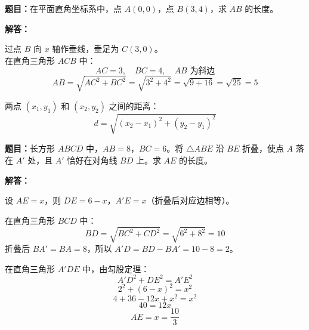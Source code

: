 \documentclass[12pt, a4paper]{ctexart}
\begin{document}
\begin{examplebox}[【例题3】勾股定理与坐标系结合]
\textbf{题目：}在平面直角坐标系中，点 $A(0,0)$，点 $B(3,4)$，求 $AB$ 的长度。

\vspace{6pt}
\textbf{解答：}

过点 $B$ 向 $x$ 轴作垂线，垂足为 $C(3,0)$。\\
在直角三角形 $ACB$ 中：
\[
AC = 3,\quad BC = 4,\quad AB \text{ 为斜边}
\]
\[
AB = \sqrt{AC^2 + BC^2} = \sqrt{3^2 + 4^2} = \sqrt{9+16} = \sqrt{25} = \boxed{5}
\]
\end{examplebox}

\begin{tipbox}
两点 $(x_1,y_1)$ 和 $(x_2,y_2)$ 之间的距离：
\[
d = \sqrt{(x_2 - x_1)^2 + (y_2 - y_1)^2}
\]
\end{tipbox}

\begin{examplebox}
\textbf{题目：}长方形 $ABCD$ 中，$AB=8$，$BC=6$。将 $\triangle ABE$ 沿 $BE$ 折叠，使点 $A$ 落在 $A'$ 处，且 $A'$ 恰好在对角线 $BD$ 上。求 $AE$ 的长度。

\begin{center}
\end{center}

\textbf{解答：}

设 $AE = x$，则 $DE = 6-x$，$A'E = x$（折叠后对应边相等）。

在直角三角形 $BCD$ 中：
\[
BD = \sqrt{BC^2 + CD^2} = \sqrt{6^2 + 8^2} = 10
\]
折叠后 $BA' = BA = 8$，所以 $A'D = BD - BA' = 10 - 8 = 2$。

在直角三角形 $A'DE$ 中，由勾股定理：
\[
A'D^2 + DE^2 = A'E^2
\]
\[
2^2 + (6-x)^2 = x^2
\]
\[
4 + 36 - 12x + x^2 = x^2
\]
\[
40 = 12x
\]
\[
\boxed{AE = x = \dfrac{10}{3}}
\]
\end{examplebox}
\end{document}
